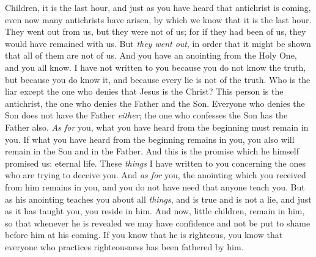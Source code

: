 \begin{biblechapter}
 Children, it is the last hour, and just as you have heard that antichrist is coming, even now many antichrists have arisen, by which we know that it is the last hour.
\verse They went out from us, but they were not of us; for if they had been of us, they would have remained with us. But \textit{they went out}, in order that it might be shown that all of them are not of us.
\verse And you have an anointing from the Holy One, and you all know.
\verse I have not written to you because you do not know the truth, but because you do know it, and because every lie is not of the truth.
\verse Who is the liar except the one who denies that Jesus is the Christ? This person is the antichrist, the one who denies the Father and the Son.
\verse Everyone who denies the Son does not have the Father \textit{either}; the one who confesses the Son has the Father also.
\verse \textit{As for} you, what you have heard from the beginning must remain in you. If what you have heard from the beginning remains in you, you also will remain in the Son and in the Father.
\verse And this is the promise which he himself promised us: eternal life.
\verse These \textit{things} I have written to you concerning the ones who are trying to deceive you.
\verse And \textit{as for} you, the anointing which you received from him remains in you, and you do not have need that anyone teach you. But as his anointing teaches you about all \textit{things}, and is true and is not a lie, and just as it has taught you, you reside in him.
 And now, little children, remain in him, so that whenever he is revealed we may have confidence and not be put to shame before him at his coming.
\verse If you know that he is righteous, you know that everyone who practices righteousness has been fathered by him.
\end{biblechapter}


